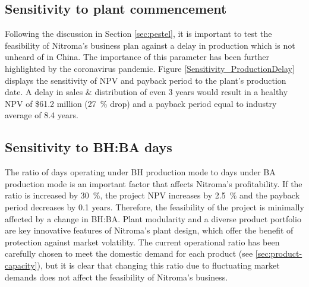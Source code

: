 \subsection{Sensitivity to plant commencement}
Following the discussion in Section \ref{sec:pestel}, it is important to test the feasibility of Nitroma’s business plan against a delay in production which is not unheard of in China. The importance of this parameter has been further highlighted by the coronavirus pandemic. Figure \ref{Sensitivity_ProductionDelay} displays the sensitivity of NPV and payback period to the plant’s production date. A delay in sales \& distribution of even 3 years would result in a healthy NPV of \$61.2 million (\SI{27}{\percent} drop) and a payback period equal to industry average of 8.4 years. 

\subsection{Sensitivity to BH:BA days}
The ratio of days operating under BH production mode to days under BA production mode is an important factor that affects Nitroma’s profitability. If the ratio is increased by \SI{30}{\percent}, the project NPV increases by \SI{2.5}{\percent} and the payback period decreases by 0.1 years. Therefore, the feasibility of the project is minimally affected by a change in BH:BA. Plant modularity and a diverse product portfolio are key innovative features of Nitroma’s plant design, which offer the benefit of protection against market volatility. The current operational ratio has been carefully chosen to meet the domestic demand for each product (see \cref{sec:product-capacity}), but it is clear that changing this ratio due to fluctuating market demands does not affect the feasibility of Nitroma’s business.


